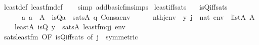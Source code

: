 \begin{isabellebody}
\ least{\isacharunderscore}{\kern0pt}def\ least{\isacharunderscore}{\kern0pt}fm{\isacharunderscore}{\kern0pt}def\isanewline
\ \ \isamarkupfalse%
\ {\isacharparenleft}{\kern0pt}simp\ add{\isacharcolon}{\kern0pt}basic{\isacharunderscore}{\kern0pt}fm{\isacharunderscore}{\kern0pt}simps{\isacharparenright}{\kern0pt}%
\endisatagproof
{\isafoldproof}%
%
\isadelimproof
\isanewline
%
\endisadelimproof
\isanewline
{}\isamarkupfalse%
\ least{\isacharunderscore}{\kern0pt}iff{\isacharunderscore}{\kern0pt}sats{\isacharcolon}{\kern0pt}\isanewline
\ \ \ is{\isacharunderscore}{\kern0pt}Q{\isacharunderscore}{\kern0pt}iff{\isacharunderscore}{\kern0pt}sats{\isacharcolon}{\kern0pt}\ \isanewline
\ \ \ \ \ \ {\isachardoublequoteopen}{\isasymAnd}a{\isachardot}{\kern0pt}\ a\ {\isasymin}\ A\ {\isasymLongrightarrow}\ is{\isacharunderscore}{\kern0pt}Q{\isacharparenleft}{\kern0pt}a{\isacharparenright}{\kern0pt}\ {\isasymlongleftrightarrow}\ sats{\isacharparenleft}{\kern0pt}A{\isacharcomma}{\kern0pt}\ q{\isacharcomma}{\kern0pt}\ Cons{\isacharparenleft}{\kern0pt}a{\isacharcomma}{\kern0pt}env{\isacharparenright}{\kern0pt}{\isacharparenright}{\kern0pt}{\isachardoublequoteclose}\isanewline
\ \ \ \isanewline
\ \ {\isachardoublequoteopen}{\isasymlbrakk}nth{\isacharparenleft}{\kern0pt}j{\isacharcomma}{\kern0pt}env{\isacharparenright}{\kern0pt}\ {\isacharequal}{\kern0pt}\ y{\isacharsemicolon}{\kern0pt}\ j\ {\isasymin}\ nat{\isacharsemicolon}{\kern0pt}\ env\ {\isasymin}\ list{\isacharparenleft}{\kern0pt}A{\isacharparenright}{\kern0pt}{\isacharsemicolon}{\kern0pt}\ {}{\isasymin}A{\isasymrbrakk}\isanewline
\ \ \ {\isasymLongrightarrow}\ least{\isacharparenleft}{\kern0pt}{\isacharhash}{\kern0pt}{\isacharhash}{\kern0pt}A{\isacharcomma}{\kern0pt}\ is{\isacharunderscore}{\kern0pt}Q{\isacharcomma}{\kern0pt}\ y{\isacharparenright}{\kern0pt}\ {\isasymlongleftrightarrow}\ sats{\isacharparenleft}{\kern0pt}A{\isacharcomma}{\kern0pt}\ least{\isacharunderscore}{\kern0pt}fm{\isacharparenleft}{\kern0pt}q{\isacharcomma}{\kern0pt}j{\isacharparenright}{\kern0pt}{\isacharcomma}{\kern0pt}\ env{\isacharparenright}{\kern0pt}{\isachardoublequoteclose}\isanewline
%
\isadelimproof
\ \ %
\endisadelimproof
%
\isatagproof
{}\isamarkupfalse%
\ sats{\isacharunderscore}{\kern0pt}least{\isacharunderscore}{\kern0pt}fm\ {\isacharbrackleft}{\kern0pt}OF\ is{\isacharunderscore}{\kern0pt}Q{\isacharunderscore}{\kern0pt}iff{\isacharunderscore}{\kern0pt}sats{\isacharcomma}{\kern0pt}\ of\ j\ {\isacharcomma}{\kern0pt}\ symmetric{\isacharbrackright}{\kern0pt}\isanewline

\end{isabellebody}
